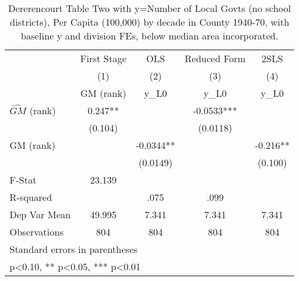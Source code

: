 \begin{table}[htbp]\centering
\def\sym#1{\ifmmode^{#1}\else\(^{#1}\)\fi}
\caption{Dererencourt Table Two with y=Number of Local Govts (no school districts), Per Capita (100,000) by decade in County 1940-70, with baseline y and division FEs, below median area incorporated.}
\begin{tabular}{l*{4}{c}}
\toprule
                    & First Stage   &         OLS   &Reduced Form   &        2SLS   \\
                    &\multicolumn{1}{c}{(1)}&\multicolumn{1}{c}{(2)}&\multicolumn{1}{c}{(3)}&\multicolumn{1}{c}{(4)}\\
                    &\multicolumn{1}{c}{GM  (rank)}&\multicolumn{1}{c}{y\_L0}&\multicolumn{1}{c}{y\_L0}&\multicolumn{1}{c}{y\_L0}\\
\midrule
$\hat{GM}$ (rank)   &       0.247** &               &     -0.0533***&               \\
                    &     (0.104)   &               &    (0.0118)   &               \\
\addlinespace
GM  (rank)          &               &     -0.0344** &               &      -0.216** \\
                    &               &    (0.0149)   &               &     (0.100)   \\
\midrule
F-Stat              &      23.139   &               &               &               \\
R-squared           &               &        .075   &        .099   &               \\
Dep Var Mean        &      49.995   &       7.341   &       7.341   &       7.341   \\
Observations        &         804   &         804   &         804   &         804   \\
\bottomrule
\multicolumn{5}{l}{\footnotesize Standard errors in parentheses}\\
\multicolumn{5}{l}{\footnotesize * p<0.10, ** p<0.05, *** p<0.01}\\
\end{tabular}
\end{table}
